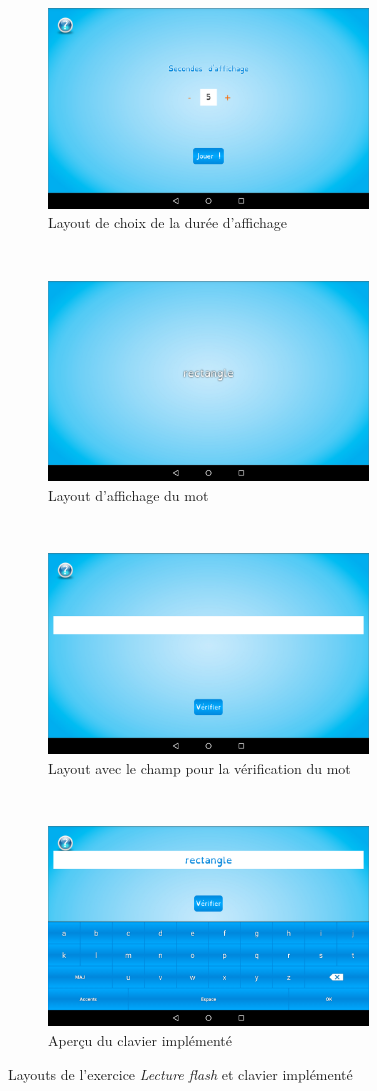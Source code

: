 \begin{figure}[H]
\begin{subfigure}[t]{8.5cm}
\includegraphics[width=8.5cm]{img/flash-pick.png}
\caption{Layout de choix de la durée d'affichage}
\label{fl1}
\end{subfigure}
~
\begin{subfigure}[t]{8.5cm}
\includegraphics[width=8.5cm]{img/flash-aff.png}
\caption{Layout d'affichage du mot}
\label{fl2}
\end{subfigure}
~
\begin{subfigure}[t]{8.5cm}
\includegraphics[width=8.5cm]{img/flash-verif.png}
\caption{Layout avec le champ pour la vérification du mot}
\label{fl3}
\end{subfigure}
~
\begin{subfigure}[t]{8.5cm}
\includegraphics[width=8.5cm]{img/flash-clavier.png}
\caption{Aperçu du clavier implémenté}
\label{fl4}
\end{subfigure}
\caption{Layouts de l'exercice \textit{Lecture flash} et clavier implémenté}
\end{figure}

